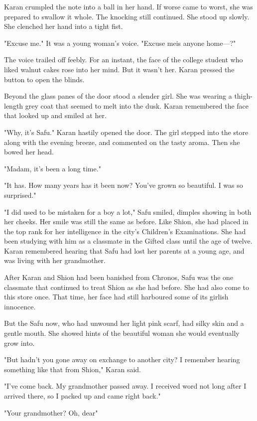 Karan crumpled the note into a ball in her hand. If worse came to worst,
she was prepared to swallow it whole. The knocking still continued. She
stood up slowly. She clenched her hand into a tight fist.

"Excuse me." It was a young woman's voice. "Excuse me\el is anyone
home---?"

The voice trailed off feebly. For an instant, the face of the college
student who liked walnut cakes rose into her mind. But it wasn't her.
Karan pressed the button to open the blinds.

Beyond the glass panes of the door stood a slender girl. She was wearing
a thigh-length grey coat that seemed to melt into the dusk. Karan
remembered the face that looked up and smiled at her.

"Why, it's Safu." Karan hastily opened the door. The girl stepped into
the store along with the evening breeze, and commented on the tasty
aroma. Then she bowed her head.

"Madam, it's been a long time."

"It has. How many years has it been now? You've grown so beautiful. I
was so surprised."

"I did used to be mistaken for a boy a lot," Safu smiled, dimples
showing in both her cheeks. Her smile was still the same as before. Like
Shion, she had placed in the top rank for her intelligence in the city's
Children's Examinations. She had been studying with him as a classmate
in the Gifted class until the age of twelve. Karan remembered hearing
that Safu had lost her parents at a young age, and was living with her
grandmother.

After Karan and Shion had been banished from Chronos, Safu was the one
classmate that continued to treat Shion as she had before. She had also
come to this store once. That time, her face had still harboured some of
its girlish innocence.

But the Safu now, who had unwound her light pink scarf, had silky skin
and a gentle mouth. She showed hints of the beautiful woman she would
eventually grow into.

"But hadn't you gone away on exchange to another city? I remember
hearing something like that from Shion," Karan said.

"I've come back. My grandmother passed away. I received word not long
after I arrived there, so I packed up and came right back."

"Your grandmother? Oh, dear\el "

